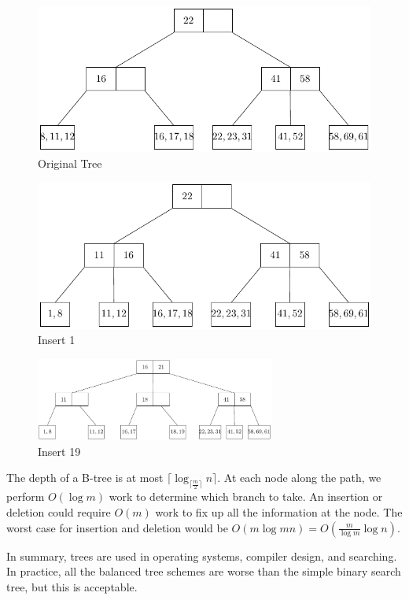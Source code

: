 \begin{minipage}{0.5\textwidth}
\begin{figure}[H]
  \centering
  \includegraphics[width=\textwidth]{Figure/BT-23T-D1.pdf}
  \caption*{Original Tree}
\end{figure}
\end{minipage}
\begin{minipage}{0.5\textwidth}
\begin{figure}[H]
  \centering
  \includegraphics[width=\textwidth]{Figure/BT-23T-D2.pdf}
  \caption*{Insert 1}
\end{figure}
\end{minipage}
\begin{figure}[H]
  \centering
  \includegraphics[width=0.7\textwidth]{Figure/BT-23T-D3.pdf}
  \caption*{Insert 19}
\end{figure}

The depth of a B-tree is at most \(\lceil \log_{\lceil \frac{m}{2} \rceil} n \rceil\). At each node along the path, we perform \(O(\log m)\) work to determine which branch to take. An insertion or deletion could require \(O(m)\) work to fix up all the information at the node. The worst case for insertion and deletion would be \(O(m \log m n) = O\left(\frac{m}{\log m} \log n\right)\).

In summary, trees are used in operating systems, compiler design, and searching. In practice, all the balanced tree schemes are worse than the simple binary search tree, but this is acceptable.
